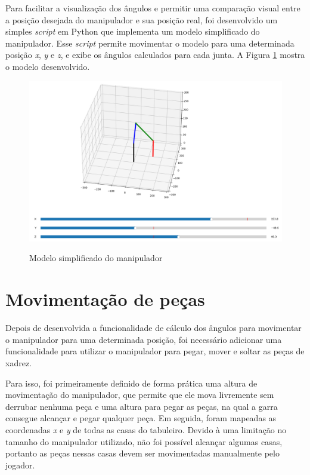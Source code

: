 Para facilitar a visualização dos ângulos e permitir uma comparação visual entre a posição desejada do manipulador e sua posição real,
foi desenvolvido um simples \textit{script} em Python que implementa um modelo simplificado do manipulador.
Esse \textit{script} permite movimentar o modelo para uma determinada posição \textit{x}, \textit{y} e \textit{z}, e exibe os ângulos calculados para cada junta.
A Figura \ref{fig:modeloManipulador} mostra o modelo desenvolvido.

\begin{figure}[H]
    \centering
    \caption{Modelo simplificado do manipulador}
    \includegraphics[keepaspectratio=true, width=1\textwidth]
    	{img/modelo-manipulador.png}
    \label{fig:modeloManipulador}
\end{figure}

\section[Movimentação de peças]{Movimentação de peças}
\label{sec:movimentacaoPecas}

Depois de desenvolvida a funcionalidade de cálculo dos ângulos para movimentar o manipulador para uma determinada posição, foi necessário adicionar uma funcionalidade para utilizar o manipulador para pegar, mover e soltar as peças de xadrez.

Para isso, foi primeiramente definido de forma prática uma altura de movimentação do manipulador, que permite que ele mova livremente sem derrubar nenhuma peça e 
uma altura para pegar as peças, na qual a garra consegue alcançar e pegar qualquer peça.
Em seguida, foram mapeadas as coordenadas \textit{x} e \textit{y} de todas as casas do tabuleiro. Devido à uma limitação no tamanho do manipulador utilizado, não foi possível alcançar algumas casas, portanto as peças nessas casas devem ser movimentadas manualmente pelo jogador.

